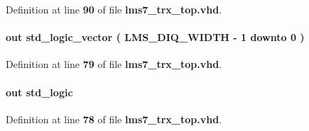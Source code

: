 Definition at line {\bf 90} of file {\bf lms7\+\_\+trx\+\_\+top.\+vhd}.

\paragraph[{L\+M\+S\+\_\+\+D\+I\+Q1\+\_\+D}]{ {\bfseries \textcolor{keywordflow}{out}\textcolor{vhdlchar}{ }} {\bfseries \textcolor{comment}{std\+\_\+logic\+\_\+vector}\textcolor{vhdlchar}{ }\textcolor{vhdlchar}{(}\textcolor{vhdlchar}{ }\textcolor{vhdlchar}{ }\textcolor{vhdlchar}{ }\textcolor{vhdlchar}{ }{\bfseries {\bf L\+M\+S\+\_\+\+D\+I\+Q\+\_\+\+W\+I\+D\+TH}} \textcolor{vhdlchar}{-\/}\textcolor{vhdlchar}{ } \textcolor{vhdldigit}{1} \textcolor{vhdlchar}{ }\textcolor{keywordflow}{downto}\textcolor{vhdlchar}{ }\textcolor{vhdlchar}{ } \textcolor{vhdldigit}{0} \textcolor{vhdlchar}{ }\textcolor{vhdlchar}{)}\textcolor{vhdlchar}{ }} \hspace{0.3cm}{\ttfamily [Port]}}\label{classlms7__trx__top_addd14862e0879a818205c096284f4b02}


Definition at line {\bf 79} of file {\bf lms7\+\_\+trx\+\_\+top.\+vhd}.

\paragraph[{L\+M\+S\+\_\+\+D\+I\+Q1\+\_\+\+I\+Q\+S\+EL}]{ {\bfseries \textcolor{keywordflow}{out}\textcolor{vhdlchar}{ }} {\bfseries \textcolor{comment}{std\+\_\+logic}\textcolor{vhdlchar}{ }} \hspace{0.3cm}{\ttfamily [Port]}}\label{classlms7__trx__top_a2c7c1ef3d7647e9514baec466f2d65ba}


Definition at line {\bf 78} of file {\bf lms7\+\_\+trx\+\_\+top.\+vhd}.

